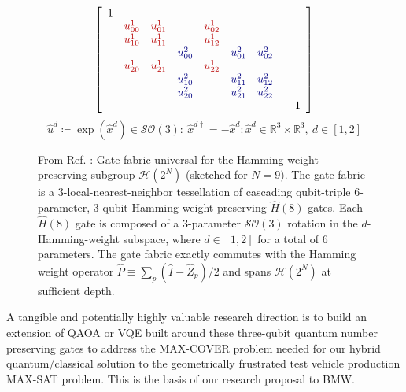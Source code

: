 \documentclass[aps,pra,twocolumn,superscriptaddress,groupedaddress]{revtex4}  %
\begin{document}
\begin{figure}
\begin{equation*}
\left [
\begin{array}{rrrrrrrrr}
1 & & & & & & & & \\
 & \color{brickred}{u_{00}^{1}} & \color{brickred}{u_{01}^{1}} & &
\color{brickred}{u_{02}^{1}} & & & & \\
 & \color{brickred}{u_{10}^{1}} & \color{brickred}{u_{11}^{1}} & &
\color{brickred}{u_{12}^{1}} & & & & \\
 & & & \color{darkblue}{u_{00}^{2}} & & \color{darkblue}{u_{01}^{2}} &
\color{darkblue}{u_{02}^{2}} & \\
 & \color{brickred}{u_{20}^{1}} & \color{brickred}{u_{21}^{1}} & &
\color{brickred}{u_{22}^{1}} & & & & \\
 & & & \color{darkblue}{u_{10}^{2}} & & \color{darkblue}{u_{11}^{2}} &
\color{darkblue}{u_{12}^{2}} & \\
 & & & \color{darkblue}{u_{20}^{2}} & & \color{darkblue}{u_{21}^{2}} &
\color{darkblue}{u_{22}^{2}} & \\
& & & & & & & & 1 \\
\end{array}
\right ]
\end{equation*}
\begin{equation*}
\hat u^{d}
\coloneqq
\exp(\hat x^{d})
\in 
\mathcal{SO}(3)
:
\
\hat x^{d\dagger}
=
-
\hat x^{d}
:
\hat x^{d}
\in
\mathbb{R}^3
\times
\mathbb{R}^3
, 
\
d \in [1, 2]
\end{equation*}
\caption{From Ref. : Gate fabric  universal for the Hamming-weight-preserving subgroup
$\mathcal{H}(2^N)$ (sketched for $N=9)$.  The gate fabric is a
3-local-nearest-neighbor tessellation of cascading qubit-triple 6-parameter,
3-qubit Hamming-weight-preserving $\hat H(8)$ gates. Each $\hat H(8)$ gate is
composed of a 3-parameter $\mathcal{SO}(3)$ rotation in the $d$-Hamming-weight
subspace, where $d \in [1, 2]$ for a total of 6 parameters. The gate fabric exactly
commutes with the Hamming weight operator $\hat P \equiv \sum_{p} (\hat I - \hat
Z_p) / 2$ and spans $\mathcal{H}(2^N)$ at sufficient depth.
}
\label{fig:H2}
\end{figure}

A tangible and potentially highly valuable research direction is to build an
extension of QAOA or VQE built around these three-qubit quantum number
preserving gates to address the MAX-COVER problem needed for our hybrid
quantum/classical solution to the geometrically frustrated test vehicle
production MAX-SAT problem. This is the basis of our research proposal to BMW.
\end{document}
